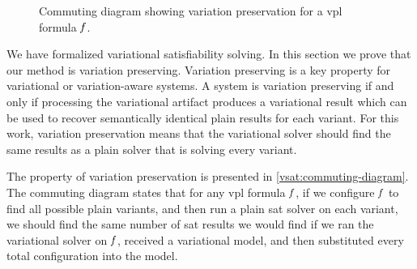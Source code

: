 \label{section:vsat:variation-preservation}
%
\begin{figure}[h]
  \centering
  
  \caption{Commuting diagram showing variation preservation for a \ac{vpl}
    formula $\mathit{f}$.}%
  \label{vsat:commuting-diagram}
\end{figure}
We have formalized variational satisfiability solving. In this section we prove
that our method is variation preserving. Variation preserving is a key property
for variational or variation-aware systems. A system is variation preserving if
and only if processing the variational artifact produces a variational result
which can be used to recover semantically identical plain results for each
variant. For this work, variation preservation means that the variational solver
should find the same results as a plain solver that is solving every variant.

The property of variation preservation is presented in
\autoref{vsat:commuting-diagram}. The commuting diagram states that for any
\ac{vpl} formula $\mathit{f}$, if we configure $\mathit{f}$ to find all possible plain
variants, and then run a plain \ac{sat} solver on each variant, we should find
the same number of \ac{sat} results we would find if we ran the variational
solver on $\mathit{f}$, received a variational model, and then substituted every
total configuration into the model.
